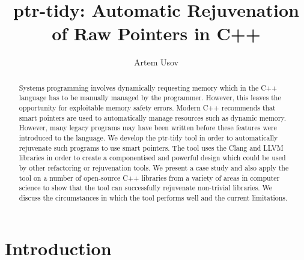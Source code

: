 \documentclass{mpaper}
\begin{document}
    \title{ptr-tidy: Automatic Rejuvenation of Raw Pointers in C++}
    \author{Artem Usov}

    \maketitle




    \begin{abstract}
    Systems programming involves dynamically requesting memory which in the C++ language has to be manually managed by the programmer. 
    However, this leaves the opportunity for exploitable memory safety errors.
    Modern C++ recommends that smart pointers are used to automatically manage resources such as dynamic memory.
    However, many legacy programs may have been written before these features were introduced to the language.
    We develop the ptr-tidy tool in order to automatically rejuvenate such programs to use smart pointers.
    The tool uses the Clang and LLVM libraries in order to create a componentised and powerful design which could be used by other refactoring or rejuvenation tools. 
    We present a case study and also apply the tool on a number of open-source C++ libraries from a variety of areas in computer science to show that the tool can successfully rejuvenate non-trivial libraries.
    We discuss the circumstances in which the tool performs well and the current limitations.
    \end{abstract}




    \section{Introduction}\label{sec:introduction}
    
\end{document}
